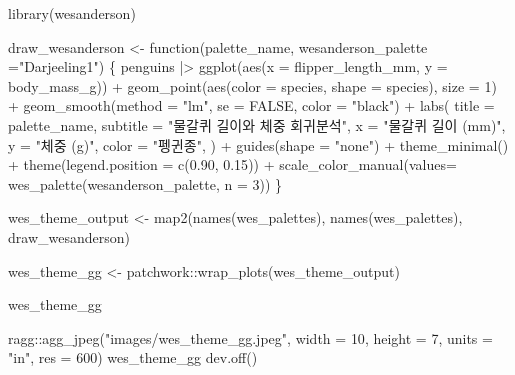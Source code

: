 \documentclass[
  letterpaper,
]{book}
\newenvironment{Shaded}{\begin{snugshade}}{\end{snugshade}}
\newcommand{\AttributeTok}[1]{\textcolor[rgb]{0.40,0.45,0.13}{#1}}
\newcommand{\ConstantTok}[1]{\textcolor[rgb]{0.56,0.35,0.01}{#1}}
\newcommand{\ControlFlowTok}[1]{\textcolor[rgb]{0.00,0.23,0.31}{#1}}
\newcommand{\DecValTok}[1]{\textcolor[rgb]{0.68,0.00,0.00}{#1}}
\newcommand{\FloatTok}[1]{\textcolor[rgb]{0.68,0.00,0.00}{#1}}
\newcommand{\FunctionTok}[1]{\textcolor[rgb]{0.28,0.35,0.67}{#1}}
\newcommand{\NormalTok}[1]{\textcolor[rgb]{0.00,0.23,0.31}{#1}}
\newcommand{\OtherTok}[1]{\textcolor[rgb]{0.00,0.23,0.31}{#1}}
\newcommand{\SpecialCharTok}[1]{\textcolor[rgb]{0.37,0.37,0.37}{#1}}
\newcommand{\StringTok}[1]{\textcolor[rgb]{0.13,0.47,0.30}{#1}}
\begin{document}
\begin{Shaded}
\begin{Highlighting}[]
\FunctionTok{library}\NormalTok{(wesanderson)}

\NormalTok{draw\_wesanderson }\OtherTok{\textless{}{-}} \ControlFlowTok{function}\NormalTok{(palette\_name, }\AttributeTok{wesanderson\_palette =}\StringTok{"Darjeeling1"}\NormalTok{) \{}
\NormalTok{  penguins }\SpecialCharTok{|\textgreater{}} 
    \FunctionTok{ggplot}\NormalTok{(}\FunctionTok{aes}\NormalTok{(}\AttributeTok{x =}\NormalTok{ flipper\_length\_mm, }\AttributeTok{y =}\NormalTok{ body\_mass\_g)) }\SpecialCharTok{+}
      \FunctionTok{geom\_point}\NormalTok{(}\FunctionTok{aes}\NormalTok{(}\AttributeTok{color =}\NormalTok{ species, }\AttributeTok{shape =}\NormalTok{ species), }\AttributeTok{size =} \DecValTok{1}\NormalTok{) }\SpecialCharTok{+}
      \FunctionTok{geom\_smooth}\NormalTok{(}\AttributeTok{method =} \StringTok{"lm"}\NormalTok{, }\AttributeTok{se =} \ConstantTok{FALSE}\NormalTok{, }\AttributeTok{color =} \StringTok{"black"}\NormalTok{)  }\SpecialCharTok{+}
      \FunctionTok{labs}\NormalTok{(}
        \AttributeTok{title =}\NormalTok{ palette\_name,}
        \AttributeTok{subtitle =} \StringTok{"물갈퀴 길이와 체중 회귀분석"}\NormalTok{,}
        \AttributeTok{x =} \StringTok{"물갈퀴 길이 (mm)"}\NormalTok{,}
        \AttributeTok{y =} \StringTok{"체중 (g)"}\NormalTok{,}
        \AttributeTok{color =} \StringTok{"펭귄종"}\NormalTok{,}
\NormalTok{      ) }\SpecialCharTok{+}
      \FunctionTok{guides}\NormalTok{(}\AttributeTok{shape =} \StringTok{"none"}\NormalTok{) }\SpecialCharTok{+}
      \FunctionTok{theme\_minimal}\NormalTok{() }\SpecialCharTok{+}
      \FunctionTok{theme}\NormalTok{(}\AttributeTok{legend.position =} \FunctionTok{c}\NormalTok{(}\FloatTok{0.90}\NormalTok{, }\FloatTok{0.15}\NormalTok{)) }\SpecialCharTok{+}  
      \FunctionTok{scale\_color\_manual}\NormalTok{(}\AttributeTok{values=} \FunctionTok{wes\_palette}\NormalTok{(wesanderson\_palette, }\AttributeTok{n =} \DecValTok{3}\NormalTok{))}
\NormalTok{\}}

\NormalTok{wes\_theme\_output }\OtherTok{\textless{}{-}} \FunctionTok{map2}\NormalTok{(}\FunctionTok{names}\NormalTok{(wes\_palettes), }\FunctionTok{names}\NormalTok{(wes\_palettes), draw\_wesanderson)}

\NormalTok{wes\_theme\_gg }\OtherTok{\textless{}{-}}\NormalTok{ patchwork}\SpecialCharTok{::}\FunctionTok{wrap\_plots}\NormalTok{(wes\_theme\_output)}

\NormalTok{wes\_theme\_gg}

\NormalTok{ragg}\SpecialCharTok{::}\FunctionTok{agg\_jpeg}\NormalTok{(}\StringTok{"images/wes\_theme\_gg.jpeg"}\NormalTok{,}
               \AttributeTok{width =} \DecValTok{10}\NormalTok{, }\AttributeTok{height =} \DecValTok{7}\NormalTok{, }\AttributeTok{units =} \StringTok{"in"}\NormalTok{, }\AttributeTok{res =} \DecValTok{600}\NormalTok{)}
\NormalTok{wes\_theme\_gg}
\FunctionTok{dev.off}\NormalTok{()}
\end{Highlighting}
\end{Shaded}
\end{document}
